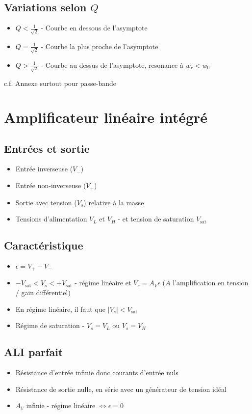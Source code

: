 \documentclass[openany]{book}
\begin{document}
\subsection{Variations selon $Q$}
\begin{itemize}
    \item $Q < \frac{1}{\sqrt{2}}$ - Courbe en dessous de l'asymptote
    \item $Q = \frac{1}{\sqrt{2}}$ - Courbe la plus proche de l'asymptote
    \item $Q > \frac{1}{\sqrt{2}}$ - Courbe au dessus de l'asymptote, resonance à $w_r < w_0$
\end{itemize}

c.f. Annexe surtout pour passe-bande

\section{Amplificateur linéaire intégré}
\subsection{Entrées et sortie}
\begin{itemize}
    \item Entrée inverseuse ($V_-$)
    \item Entrée non-inverseuse ($V_+$)
    \item Sortie avec tension ($V_s$) relative à la masse
    \item Tensions d'alimentation $V_L$ et $V_H$ - et tension de saturation $V_{\text{sat}}$
\end{itemize}

\subsection{Caractéristique}
\begin{itemize}
    \item $ \epsilon = V_+ - V_- $
    \item $ -V_{\text{sat}} < V_s < +V_{\text{sat}} $ - régime linéaire et $V_s = A_V\epsilon$ ($A$ l'amplification en tension / gain différentiel)
    \item En régime linéaire, il faut que $|V_s| < V_{\text{sat}}$
    \item Régime de saturation - $ V_s = V_L $ ou $ V_s = V_H $
\end{itemize}

\subsection{ALI parfait}
\begin{itemize}
    \item Résistance d'entrée infinie donc courants d'entrée nuls
    \item Résistance de sortie nulle, en série avec un générateur de tension idéal
    \item $A_V$ infinie - régime linéaire $\iff \epsilon = 0$
\end{itemize}
\end{document}
